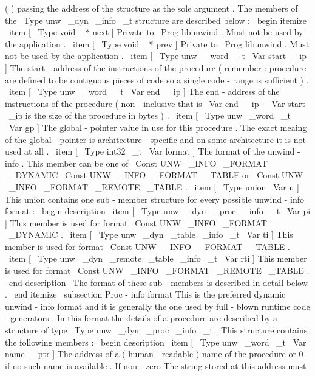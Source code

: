 (
)
passing
the
address
of
the
structure
as
the
sole
argument
.
The
members
of
the
\
Type
{
unw
\
_dyn
\
_info
\
_t
}
structure
are
described
below
:
\
begin
{
itemize
}
\
item
[
\
Type
{
void
~
*
}
next
]
Private
to
\
Prog
{
libunwind
}
.
Must
not
be
used
by
the
application
.
\
item
[
\
Type
{
void
~
*
}
prev
]
Private
to
\
Prog
{
libunwind
}
.
Must
not
be
used
by
the
application
.
\
item
[
\
Type
{
unw
\
_word
\
_t
}
\
Var
{
start
\
_ip
}
]
The
start
-
address
of
the
instructions
of
the
procedure
(
remember
:
procedure
are
defined
to
be
contiguous
pieces
of
code
so
a
single
code
-
range
is
sufficient
)
.
\
item
[
\
Type
{
unw
\
_word
\
_t
}
\
Var
{
end
\
_ip
}
]
The
end
-
address
of
the
instructions
of
the
procedure
(
non
-
inclusive
that
is
\
Var
{
end
\
_ip
}
-
\
Var
{
start
\
_ip
}
is
the
size
of
the
procedure
in
bytes
)
.
\
item
[
\
Type
{
unw
\
_word
\
_t
}
\
Var
{
gp
}
]
The
global
-
pointer
value
in
use
for
this
procedure
.
The
exact
meaing
of
the
global
-
pointer
is
architecture
-
specific
and
on
some
architecture
it
is
not
used
at
all
.
\
item
[
\
Type
{
int32
\
_t
}
\
Var
{
format
}
]
The
format
of
the
unwind
-
info
.
This
member
can
be
one
of
\
Const
{
UNW
\
_INFO
\
_FORMAT
\
_DYNAMIC
}
\
Const
{
UNW
\
_INFO
\
_FORMAT
\
_TABLE
}
or
\
Const
{
UNW
\
_INFO
\
_FORMAT
\
_REMOTE
\
_TABLE
}
.
\
item
[
\
Type
{
union
}
\
Var
{
u
}
]
This
union
contains
one
sub
-
member
structure
for
every
possible
unwind
-
info
format
:
\
begin
{
description
}
\
item
[
\
Type
{
unw
\
_dyn
\
_proc
\
_info
\
_t
}
\
Var
{
pi
}
]
This
member
is
used
for
format
\
Const
{
UNW
\
_INFO
\
_FORMAT
\
_DYNAMIC
}
.
\
item
[
\
Type
{
unw
\
_dyn
\
_table
\
_info
\
_t
}
\
Var
{
ti
}
]
This
member
is
used
for
format
\
Const
{
UNW
\
_INFO
\
_FORMAT
\
_TABLE
}
.
\
item
[
\
Type
{
unw
\
_dyn
\
_remote
\
_table
\
_info
\
_t
}
\
Var
{
rti
}
]
This
member
is
used
for
format
\
Const
{
UNW
\
_INFO
\
_FORMAT
\
_REMOTE
\
_TABLE
}
.
\
end
{
description
}
\
The
format
of
these
sub
-
members
is
described
in
detail
below
.
\
end
{
itemize
}
\
subsection
{
Proc
-
info
format
}
This
is
the
preferred
dynamic
unwind
-
info
format
and
it
is
generally
the
one
used
by
full
-
blown
runtime
code
-
generators
.
In
this
format
the
details
of
a
procedure
are
described
by
a
structure
of
type
\
Type
{
unw
\
_dyn
\
_proc
\
_info
\
_t
}
.
This
structure
contains
the
following
members
:
\
begin
{
description
}
\
item
[
\
Type
{
unw
\
_word
\
_t
}
\
Var
{
name
\
_ptr
}
]
The
address
of
a
(
human
-
readable
)
name
of
the
procedure
or
0
if
no
such
name
is
available
.
If
non
-
zero
The
string
stored
at
this
address
must
